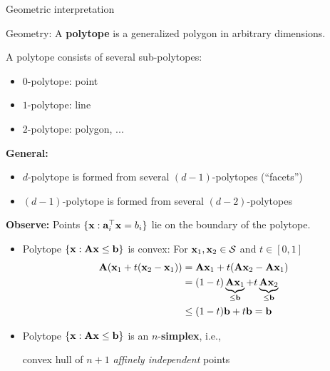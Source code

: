 \documentclass[11pt,compress,t,notes=noshow, xcolor=table]{beamer}
\begin{document}
\begin{vbframe}{Geometric interpretation}


\framebreak

Geometry: A \textbf{polytope} is a generalized polygon in arbitrary dimensions.

\medskip

A polytope consists of several sub-polytopes:
\begin{itemize}
    \setlength{\itemsep}{1em}
    \item $0$-polytope: point
    \item $1$-polytope: line
    \item $2$-polytope: polygon, ...
\end{itemize}

\medskip

\textbf{General:}
\begin{itemize}
    \setlength{\itemsep}{1em}
    \item $d$-polytope is formed from several $(d-1)$-polytopes (\enquote{facets})
    \item $(d-1)$-polytope is formed from several $(d-2)$-polytopes
\end{itemize}

\framebreak

\textbf{Observe:} Points $\{\mathbf{x}: \mathbf{a}_i^\top \mathbf{x} = b_i\}$ lie on the boundary of the polytope.

\medskip

\begin{itemize}
    \item Polytope $\{ \mathbf{x}: \mathbf{A} \mathbf{x} \le \mathbf{b}\}$ is convex: For $\mathbf{x}_1,\mathbf{x}_2 \in \mathcal{S}$ and $t \in [0, 1]$
        \begin{align*}
            \mathbf{A}(\mathbf{x}_1 + t(\mathbf{x}_2 - \mathbf{x}_1)) &= \mathbf{A}\mathbf{x}_1 + t(\mathbf{A}\mathbf{x}_2 - \mathbf{A}\mathbf{x}_1) \\
            &= (1 -t)\underbrace{\mathbf{A}\mathbf{x}_1}_{\le \mathbf{b}} + t\underbrace{\mathbf{A}\mathbf{x}_2}_{\le \mathbf{b}} \\ &\le (1 - t) \mathbf{b} + t \mathbf{b} = \mathbf{b}
        \end{align*}
    \item Polytope $\{ \mathbf{x}: \mathbf{A} \mathbf{x} \le \mathbf{b}\}$ is an $n$-\textbf{simplex}, i.e.,
        \begin{center}
            convex hull of $n + 1$ \textit{affinely independent} points
        \end{center}
\end{itemize}


\end{vbframe}
\end{document}
